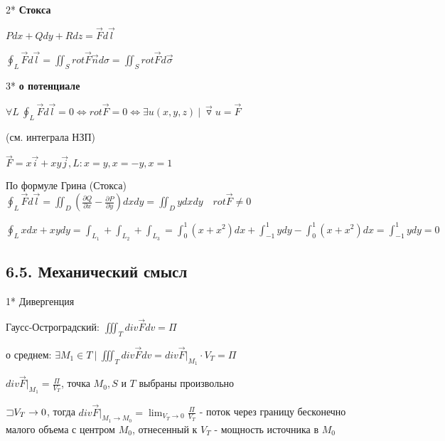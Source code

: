 \documentclass[12pt]{article}
\begin{document}
    2* \textbf{Стокса}

    $Pdx + Qdy + Rdz = \overrightarrow{F}d\overrightarrow{l}$

    $\oint_L \overrightarrow{F}d\overrightarrow{l} = \iint_S rot \overrightarrow{F} \overrightarrow{n} d\sigma = \iint_S rot \overrightarrow{F} d\overrightarrow{\sigma}$

    \mediumvspace

    \hypertarget{theoremaboutpotentialinvectorform}{}

    3* \textbf{\Ths о потенциале}

    $\forall L \ \oint_L \overrightarrow{F}d\overrightarrow{l} = 0 \Longleftrightarrow rot \overrightarrow{F} = 0 \Longleftrightarrow \exists u(x, y, z) \ | \ \overrightarrow{\triangledown} u = \overrightarrow{F}$

    (см. \Ths интеграла НЗП)

    \Ex $\overrightarrow{F} = x\overrightarrow{i} + xy \overrightarrow{j}, L: x = y, x = -y, x = 1$

    По формуле Грина (Стокса) $\oint_L \overrightarrow{F} d\overrightarrow{l} = \iint_{D} \left(\frac{\partial Q}{\partial x} - \frac{\partial P}{\partial y}\right) dxdy =
    \iint_D y dxdy \quad rot \overrightarrow{F} \neq 0$

    $\oint_L xdx + xydy = \int_{L_1} + \int_{L_2} + \int_{L_3} = \int_0^1 (x + x^2) dx + \int_{-1}^1 y dy - \int_0^1 (x + x^2) dx = \int_{-1}^1 y dy = 0$

    \subsection{6.5. Механический смысл}

    \hypertarget{divergencemechanicalmeaning}{}

    1* Дивергенция

    Гаусс-Остроградский: $\iiint_T div \overrightarrow{F} dv = \Pi$

    \Ths о среднем: $\exists M_1 \in T \ | \ \iiint_T div \overrightarrow{F} dv = div \overrightarrow{F} \Big|_{M_1} \cdot V_T = \Pi$

    $div \overrightarrow{F} \Big|_{M_1} = \frac{\Pi}{V_T}$, точка $M_0, S$ и $T$ выбраны произвольно

    $\mathord{\sqsupset} V_T \to 0$, тогда $div \overrightarrow{F} \Big|_{M_1 \to M_0} = \lim_{V_T \to 0} \frac{\Pi}{V_T}$ - поток через границу бесконечно малого объема с центром $M_0$, отнесенный к $V_T$ - мощность источника в $M_0$
\end{document}
